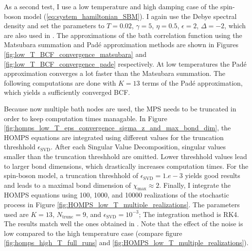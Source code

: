 As a second test, I use a low temperature and high damping case of the spin-boson model (\ref{eq:system_hamiltonian_SBM}). I again use the Debye spectral
density and set the parameters to $T = 0.02$, $\gamma = 5$, $\eta = 0.5$, $\epsilon = 2$, $\Delta = -2$, which are also used in \cite{Suess:2014,Song:2016}.
The approximations of the bath correlation function using the Matsubara summation and Padé approximation methods are shown in Figures \ref{fig:low_T_BCF_convergence_matsubara} and \ref{fig:low_T_BCF_convergence_pade} respectively.
At low temperatures the Padé approximation converges a lot faster than the Matsubara summation. The following computations are done with $K=13$ terms of the
Padé approximation, which yields a sufficiently converged BCF.


\newpage
\noindent Because now multiple bath nodes are used, the MPS needs to be truncated in order to keep computation times managable. In Figure \ref{fig:homps_low_T_eps_convergence_sigma_z_and_max_bond_dim}, 
the HOMPS equations are integrated using different values for the truncation threshhold $\epsilon_\text{SVD}$. After each Singular Value Decomposition,
singular values smaller than the truncation threshhold are omitted. Lower threshhold values lead to larger bond dimensions, which drastically increases computation times.
For the spin-boson model, a truncation threshhold of $\epsilon_\text{SVD} = 1.e-3$ yields good results and leads to a maximal bond dimension
of $\chi_{\text{max}} \approx 2$.
Finally, I integrate the HOMPS equations using 100, 1000, and 10000 realizations of the stochastic process in Figure \ref{fig:HOMPS_low_T_multiple_realizations}.
The parameters used are $K = 13$, $N_\text{trunc} = 9$, and $\epsilon_\text{SVD} = 10^{-3}$; The integration method is RK4. The results match well the ones obtained in \cite{Suess:2014,Song:2016}.
Note that the effect of the noise is low compared to the high temperature case (compare figure \ref{fig:homps_high_T_full_runs} and \ref{fig:HOMPS_low_T_multiple_realizations}).

